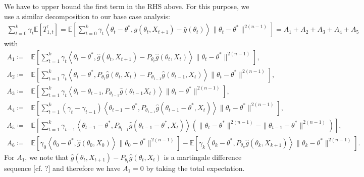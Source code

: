 \documentclass[a4paper]{article}
\newcommand{\norm}[1]{\|#1 \|}
\newcommand{\Exs}{\mathbb{E}}
\newcommand{\thetastar}{\theta^*}
\newcommand{\constTprime}[1]{T_{#1}^{\prime}}
\begin{document}
	We have to upper bound the first term in the RHS above. For this purpose, we use a similar decomposition to our base case analysis:
	\begin{align*}
		\sum_{t = 0}^{k}\gamma_{t}\Exs\left[\constTprime{1, t}\right] = \Exs\left[\sum_{t = 0}^{k}\gamma_{t}\left\langle \theta_{t} - \thetastar, g\left(\theta_{t}, X_{t + 1}\right) - \bar{g}\left(\theta_{t}\right)\right\rangle\norm{\theta_{t} - \thetastar}^{2(n - 1)}\right] = A_{1} + A_{2} + A_{3} + A_{4} + A_{5}
	\end{align*} 
	with
	\begin{align*}
		A_{1} \coloneq & \Exs\left[\sum_{t = 1}^{k}\gamma_{t}\left\langle \theta_{t} - \thetastar, \hat{g}\left(\theta_{t}, X_{t + 1}\right) - P_{\theta_{t}}\hat{g}\left(\theta_{t}, X_{t}\right) \right\rangle\norm{\theta_{t} - \thetastar}^{2(n - 1)}\right],\\
		A_{2} \coloneq & \Exs\left[\sum_{t = 1}^{k}\gamma_{t}\left\langle \theta_{t} - \thetastar, P_{\theta_{t}}\hat{g}\left(\theta_{t}, X_{t}\right) - P_{\theta_{t - 1}}\hat{g}\left( \theta_{t - 1}, X_{t} \right) \right\rangle\norm{\theta_{t} - \thetastar}^{2(n - 1)}\right],\\
		A_{3} \coloneq & \Exs\left[\sum_{t = 1}^{k}\gamma_{t}\left\langle \theta_{t} - \theta_{t - 1}, P_{\theta_{t - 1}}\hat{g}\left( \theta_{t - 1} X_{t}\right) \right\rangle \norm{\theta_{t} - \thetastar}^{2(n - 1)}\right],\\
		A_{4} \coloneq & \Exs\left[\sum_{t = 1}^{k}\left(\gamma_{t} - \gamma_{t - 1}\right)\left\langle \theta_{t - 1} - \thetastar, P_{\theta_{t - 1}}\hat{g}\left( \theta_{t - 1} - \thetastar, X_{t}\right) \right\rangle\norm{\theta_{t} - \thetastar}^{2(n - 1)}\right],\\
		A_{5} \coloneq & \Exs\left[\sum_{t = 1}^{k}\gamma_{t - 1}\left\langle \theta_{t - 1} - \thetastar, P_{\theta_{t - 1}}\hat{g}\left(\theta_{t - 1} - \thetastar, X_{t}\right)\right\rangle\left(\norm{\theta_{t} - \thetastar}^{2(n - 1)} - \norm{\theta_{t - 1} - \thetastar}^{2(n - 1)}\right)\right],\\
		A_{6} \coloneq & \Exs\left[\gamma_{0}\left\langle \theta_{0} - \thetastar, \hat{g}\left(\theta_{0}, X_{0}\right) \right\rangle\norm{\theta_{0} - \thetastar}^{2(n - 1)}\right] - \Exs\left[\gamma_{k}\left\langle \theta_{k} - \thetastar, P_{\theta_{k}}\hat{g}\left(\theta_{k}, X_{k + 1}\right)\right\rangle\norm{\theta_{k} - \thetastar}^{2(n - 1)}\right].
	\end{align*}
	For $A_{1}$, we note that $\hat{g}\left(\theta_{t}, X_{t + 1}\right) - P_{\theta_{t}} \hat{g}\left(\theta_{t}, X_{t}\right)$ is a martingale difference sequence [cf. ?] and therefore we have $A_{1} = 0$ by taking the total expectation.
	
\end{document}
